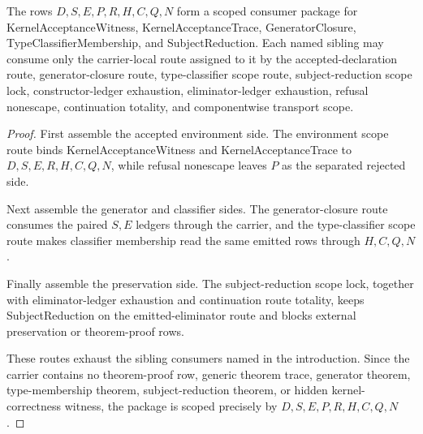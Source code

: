 \begin{theorem}
\label{thm:kernel-inductive-acceptance-scoped-consumer-package}
The rows $D,S,E,P,R,H,C,Q,N$ form a scoped consumer package for KernelAcceptanceWitness, KernelAcceptanceTrace, GeneratorClosure, TypeClassifierMembership, and SubjectReduction. Each named sibling may consume only the carrier-local route assigned to it by the accepted-declaration route, generator-closure route, type-classifier scope route, subject-reduction scope lock, constructor-ledger exhaustion, eliminator-ledger exhaustion, refusal nonescape, continuation totality, and componentwise transport scope.
\end{theorem}
\begin{proof}
First assemble the accepted environment side. The environment scope route binds KernelAcceptanceWitness and KernelAcceptanceTrace to $D,S,E,R,H,C,Q,N$, while refusal nonescape leaves $P$ as the separated rejected side.

Next assemble the generator and classifier sides. The generator-closure route consumes the paired $S,E$ ledgers through the carrier, and the type-classifier scope route makes classifier membership read the same emitted rows through $H,C,Q,N$.

Finally assemble the preservation side. The subject-reduction scope lock, together with eliminator-ledger exhaustion and continuation route totality, keeps SubjectReduction on the emitted-eliminator route and blocks external preservation or theorem-proof rows.

These routes exhaust the sibling consumers named in the introduction. Since the carrier contains no theorem-proof row, generic theorem trace, generator theorem, type-membership theorem, subject-reduction theorem, or hidden kernel-correctness witness, the package is scoped precisely by $D,S,E,P,R,H,C,Q,N$.
\end{proof}

